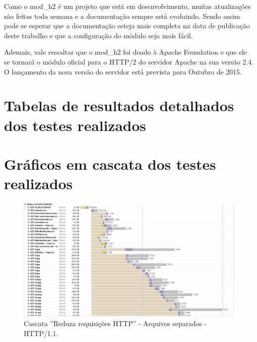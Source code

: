\begin{apendicesenv}
Como o mod\_h2 é um projeto que está em desenvolvimento, muitas atualizações são feitas toda semana e a documentação sempre está evoluindo. Sendo assim pode se esperar que a documentação esteja mais completa na data de publicação deste trabalho e que a configuração do módulo seja mais fácil.

Ademais, vale ressaltar que o mod\_h2 foi doado à Apache Foundation e que ele se tornará o módulo oficial para o HTTP/2 do servidor Apache na sua versão 2.4. O lançamento da nova versão do servidor está prevista para Outubro de 2015.

\chapter{Tabelas de resultados detalhados dos testes realizados}
\label{apend:tabelasdetalhadas}

















\chapter{Gráficos em cascata dos testes realizados}
\label{apend:graficosemcascata}

\begin{landscape}
	\begin{figure}[!htb]
	    \centering
	    \caption{Cascata ''Reduza requisições HTTP'' - Arquivos separados - HTTP/1.1.}
    	\includegraphics[width=1.5\textwidth]{./04-figuras/cascatas/separados_http11}
	\end{figure}
\end{landscape}


\end{apendicesenv}
